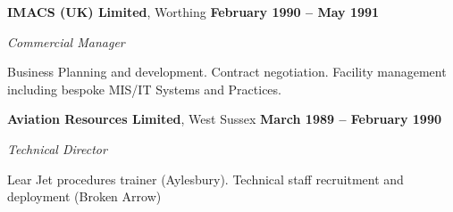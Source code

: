 \documentclass[10pt]{article}
\newenvironment{outerlist}[1][\enskip\textbullet]%
        {\begin{itemize}[#1]}{\end{itemize}%
         \vspace{-.6\baselineskip}}
\newenvironment{innerlist}[1][\enskip\textbullet]%
        {\begin{compactitem}[#1]}{\end{compactitem}}
\newcommand{\blankline}{\quad\pagebreak[2]}
\begin{document}
\begin{outerlist}
%
%

%
%
\end{outerlist}
%

\blankline

\textbf{IMACS (UK) Limited}, Worthing        \hfill \textbf{February 1990 -- May 1991}

\begin{innerlist}

\item[] \textit{Commercial Manager}%
\begin{innerlist}
\item Business Planning and development. Contract negotiation. Facility management including bespoke MIS/IT Systems and Practices.

\end{innerlist}

\end{innerlist}

\blankline

\textbf{Aviation Resources Limited}, West Sussex        \hfill \textbf{March 1989 -- February 1990}

\begin{innerlist}
\item[] \textit{Technical Director}
	\begin{innerlist}
	\item Lear Jet procedures trainer (Aylesbury). Technical staff recruitment and deployment (Broken Arrow)
	\end{innerlist}
\end{innerlist}
\end{document}
